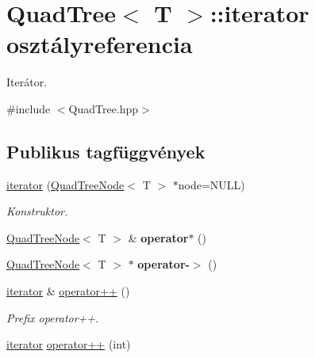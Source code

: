 \hypertarget{class_quad_tree_1_1iterator}{\section{Quad\-Tree$<$ T $>$\-:\-:iterator osztályreferencia}
\label{class_quad_tree_1_1iterator}
}


Iterátor.  




{\ttfamily \#include $<$Quad\-Tree.\-hpp$>$}

\subsection*{Publikus tagfüggvények}
\begin{DoxyCompactItemize}
\item 
\hypertarget{class_quad_tree_1_1iterator_adbc837646b916ce34876855f52ce76e3}{\hyperlink{class_quad_tree_1_1iterator_adbc837646b916ce34876855f52ce76e3}{iterator} (\hyperlink{class_quad_tree_node}{Quad\-Tree\-Node}$<$ T $>$ $\ast$node=N\-U\-L\-L)}\label{class_quad_tree_1_1iterator_adbc837646b916ce34876855f52ce76e3}

\begin{DoxyCompactList}\small\item\em Konstruktor. \end{DoxyCompactList}\item 
\hypertarget{class_quad_tree_1_1iterator_a8a17ddd1067466f5c8a7f0cd65e57c4a}{\hyperlink{class_quad_tree_node}{Quad\-Tree\-Node}$<$ T $>$ \& {\bfseries operator$\ast$} ()}\label{class_quad_tree_1_1iterator_a8a17ddd1067466f5c8a7f0cd65e57c4a}

\item 
\hypertarget{class_quad_tree_1_1iterator_a12900f2e237588e0fd78eafb6c009364}{\hyperlink{class_quad_tree_node}{Quad\-Tree\-Node}$<$ T $>$ $\ast$ {\bfseries operator-\/$>$} ()}\label{class_quad_tree_1_1iterator_a12900f2e237588e0fd78eafb6c009364}

\item 
\hyperlink{class_quad_tree_1_1iterator}{iterator} \& \hyperlink{class_quad_tree_1_1iterator_a94a8a729d88aa6ec105d748ac9a5d14e}{operator++} ()
\begin{DoxyCompactList}\small\item\em Prefix operator++. \end{DoxyCompactList}\item 
\hypertarget{class_quad_tree_1_1iterator_a191a4cc5febf9c0c313f52770332f712}{\hyperlink{class_quad_tree_1_1iterator}{iterator} \hyperlink{class_quad_tree_1_1iterator_a191a4cc5febf9c0c313f52770332f712}{operator++} (int)}\label{class_quad_tree_1_1iterator_a191a4cc5febf9c0c313f52770332f712}


\end{DoxyCompactItemize}
